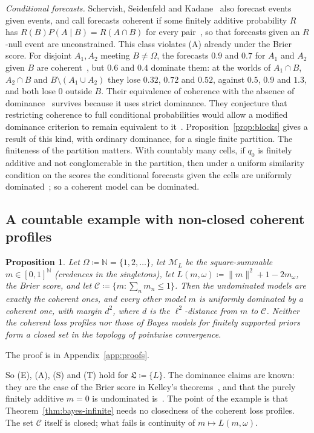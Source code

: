 \documentclass[11pt]{article}
\newtheorem{proposition}[theorem]{Proposition}
\theoremstyle{definition}
\theoremstyle{remark}
\newcommand{\N}{\mathbb N}
\newcommand{\M}{\mathcal M}
\newcommand{\C}{\mathcal C}
\newcommand{\Lf}{\mathfrak L}
\begin{document}
\emph{Conditional forecasts.} Schervish, Seidenfeld and Kadane~\cite{SSK09} also forecast events given events, and call forecasts coherent if some finitely additive probability $R$ has $R(B)P(A\mid B)=R(A\cap B)$ for every pair~\cite[Lemma~11]{SSK09}, so that forecasts given an $R$-null event are unconstrained. This class violates (A) already under the Brier score. For disjoint $A_1,A_2$ meeting $B\ne\Omega$, the forecasts $0.9$ and $0.7$ for $A_1$ and $A_2$ given $B$ are coherent~\cite[Section~6]{SSK09}, but $0.6$ and $0.4$ dominate them: at the worlds of $A_1\cap B$, $A_2\cap B$ and $B\setminus(A_1\cup A_2)$ they lose $0.32$, $0.72$ and $0.52$, against $0.5$, $0.9$ and $1.3$, and both lose $0$ outside $B$. Their equivalence of coherence with the absence of dominance~\cite[Theorem~1]{SSK09} survives because it uses strict dominance. They conjecture that restricting coherence to full conditional probabilities would allow a modified dominance criterion to remain equivalent to it~\cite[Section~6]{SSK09}. Proposition~\ref{prop:blocks} gives a result of this kind, with ordinary dominance, for a single finite partition. The finiteness of the partition matters. With countably many cells, if $q_0$ is finitely additive and not conglomerable in the partition, then under a uniform similarity condition on the scores the conditional forecasts given the cells are uniformly dominated~\cite[Theorem~2]{SSK14}; so a coherent model can be dominated.

\subsection{A countable example with non-closed coherent profiles}
\begin{proposition}\label{prop:countable}
Let $\Omega\coloneqq\N=\{1,2,\dots\}$, let $\M_L$ be the square-summable $m\in[0,1]^\N$ (credences in the singletons), let $L(m,\omega)\coloneqq\lVert m\rVert^2+1-2m_\omega$, the Brier score, and let $\C\coloneqq\{m:\sum_nm_n\le1\}$. Then the undominated models are exactly the coherent ones, and every other model $m$ is uniformly dominated by a coherent one, with margin $d^2$, where $d$ is the $\ell^2$-distance from $m$ to $\C$. Neither the coherent loss profiles nor those of Bayes models for finitely supported priors form a closed set in the topology of pointwise convergence.
\end{proposition}
The proof is in Appendix~\ref{app:proofs}.

So (E), (A), (S) and (T) hold for $\Lf\coloneqq\{L\}$. The dominance claims are known: they are the case of the Brier score in Kelley's theorems~\cite[Theorems~3.4 and~4.26]{Kelley}, and that the purely finitely additive $m=0$ is undominated is~\cite[Example~3]{SSK14}. The point of the example is that Theorem~\ref{thm:bayes-infinite} needs no closedness of the coherent loss profiles. The set $\C$ itself is closed; what fails is continuity of $m\mapsto L(m,\omega)$.
\end{document}
